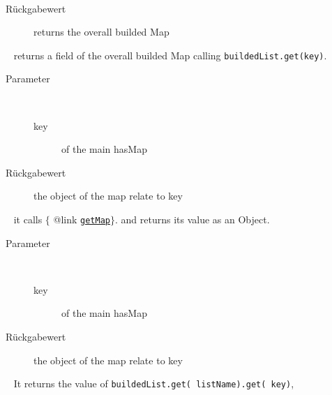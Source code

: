 \begin{description}
\item[{\label{ontologyFramework.OFRunning.OFInvokingManager.OFBuildedListInvoker.getMap()}}]
~ 
\begin{description}
\item[Rückgabewert] 
returns the overall builded Map
\end{description}
\item[{\label{ontologyFramework.OFRunning.OFInvokingManager.OFBuildedListInvoker.getMap(java.lang.String)}}]
~ returns a field of the overall builded Map calling
 \verb!buildedList.get(key)!.
\begin{description}
\item[Parameter] ~
\begin{description}
\item[key]
of the main hasMap
\end{description}
\item[Rückgabewert] 
the object of the map relate to key
\end{description}
\item[{\label{ontologyFramework.OFRunning.OFInvokingManager.OFBuildedListInvoker.getStaticListFromName(java.lang.String)}}]
~ it calls $\{$ @link \texttt{\hyperlink{ontologyFramework.OFRunning.OFInvokingManager.OFBuildedListInvoker.getMap(java.lang.String)}{getMap}}$\}$.
 and returns its value as an Object.
\begin{description}
\item[Parameter] ~
\begin{description}
\item[key]
of the main hasMap
\end{description}
\item[Rückgabewert] 
the object of the map relate to key
\end{description}
\item[{\label{ontologyFramework.OFRunning.OFInvokingManager.OFBuildedListInvoker.getClassFromList(java.lang.String,java.lang.String)}}]
~ It returns the value of \verb!buildedList.get( listName).get( key)!,

\end{description}
